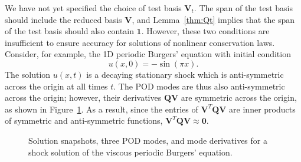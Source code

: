\documentclass[preprint,10pt]{elsarticle}
\theoremstyle{definition}
\theoremstyle{lemma}
\theoremstyle{theorem}
\theoremstyle{assumption}
\begin{document}
We have not yet specified the choice of test basis $\bm{V}_t$.  The span of the test basis should include the reduced basis $\bm{V}$, and Lemma~\ref{thm:Qt} implies that the span of the test basis should also contain $\bm{1}$.  However, these two conditions are insufficient to ensure accuracy for solutions of nonlinear conservation laws.  Consider, for example, the 1D periodic Burgers' equation with initial condition 
\[
u(x,0) = -\sin(\pi x).
\]
The solution $u(x,t)$ is a decaying stationary shock which is anti-symmetric across the origin at all times $t$.  The POD modes are thus also anti-symmetric across the origin; however, their derivatives $\bm{Q}\bm{V}$ are symmetric across the origin, as shown in Figure~\ref{fig:modeQ}.  As a result, since the entries of $\bm{V}^T\bm{Q}\bm{V}$ are inner products of symmetric and anti-symmetric functions, $\bm{V}^T\bm{Q}\bm{V} \approx \bm{0}$.
\begin{figure}[!h]
\centering
{}
\hspace{.1em}
\hspace{.1em}
\caption{Solution snapshots, three POD modes, and mode derivatives for a shock solution of the viscous periodic Burgers' equation. }
\label{fig:modeQ}
\end{figure}
\end{document}

